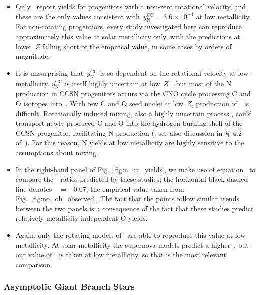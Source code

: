 \documentclass[ms.tex]{subfiles}
\begin{document}
\begin{itemize}
	\item Only~\citet{Limongi2018} report yields for progenitors with a 
	non-zero rotational velocity, and these are the only values consistent 
	with~$y_\text{N}^\text{CC} = 3.6\times10^{-4}$ at low metallicity. 
	For non-rotating progentiors, every study investigated here can reproduce 
	approximately this value at solar metallicity only, with the predictions at 
	lower~$Z$ falling short of the empirical value, in some cases by orders of 
	magnitude. 

	\item It is unsurprising that~$y_\text{N}^\text{CC}$ is so dependent on the 
	rotational velocity at low metallicity. 
	$y_\text{N}^\text{CC}$ is itself highly uncertain at 
	low~$Z$~\citep{Heger2010}, but most of the N production in CCSN progenitors 
	occurs via the CNO cycle processing C and O isotopes into~\Nfourteen. 
	With few C and O seed nuclei at low~$Z$, production of~\Nfourteen~is 
	difficult. 
	Rotationally induced mixing, also a highly uncertain process 
	\citep{Zahn1992, Maeder1998, Lagarde2012}, could transport newly produced 
	C and O into the hydrogen burning shell of the CCSN progenitor, 
	facilitating N production (\citealp{Frischknecht2016}; see also discussion 
	in~\S~4.2 of~\citealp{Andrews2017}). 
	For this reason, N yields at low metallicity are highly sensitive to the 
	assumptions about mixing. 

	\item In the right-hand panel of Fig.~\ref{fig:n_cc_yields}, we make use of 
	equation~ to compare the~\no~ratios predicted by these 
	studies; the horizontal black dashed line denotes~\no\subcc~$= -0.07$, the 
	empirical value taken from Fig.~\ref{fig:no_oh_observed}. 
	The fact that the points follow similar trends between the two panels is a 
	consequence of the fact that these studies predict relatively 
	metallicity-independent O yields. 

	\item Again, only the rotating models of~\citet{Limongi2018} are able to 
	reproduce this value at low metallicity. 
	At solar metallicity the supernova models predict a higher~\no\subcc, but 
	our value of~\no\subcc~is taken at low metallicity, so that is the 
	most relevant comparison. 
\end{itemize} 

\subsubsection{Asymptotic Giant Branch Stars} 
\label{sec:methods:yields:agb} 
\end{document}
